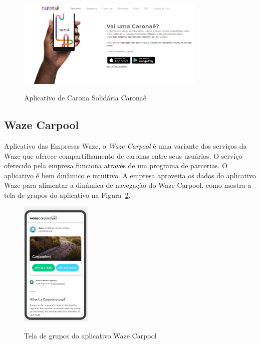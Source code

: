 \begin{figure}[!hbtp]
	\centering
	\caption{Aplicativo de Carona Solidária Caronaê}
	\includegraphics[width=0.8\textwidth]{./04-figuras/caronae.png}
	\label{fig:caronae}
\end{figure}



\subsection{Waze Carpool}
Aplicativo das Empresas Waze, o \textit{Waze Carpool} é uma variante dos serviços da Waze que oferece compartilhamento de caronas entre seus usuários. O serviço oferecido pela empresa funciona através de um programa de parcerias. O aplicativo é bem dinâmico e intuitivo. A empresa aproveita os dados do aplicativo Waze para alimentar a dinâmica de navegação do Waze Carpool. como mostra a tela de grupos do aplicativo na Figura~\ref{fig:tela_grupos_wazecarpool}.

\begin{figure}[!hbtp]
	\centering
	\caption{Tela de grupos do aplicativo Waze Carpool}
	\includegraphics[width=0.3\textwidth]{./04-figuras/waze/Tela_de_grupos.png}
	\label{fig:tela_grupos_wazecarpool}
\end{figure}

